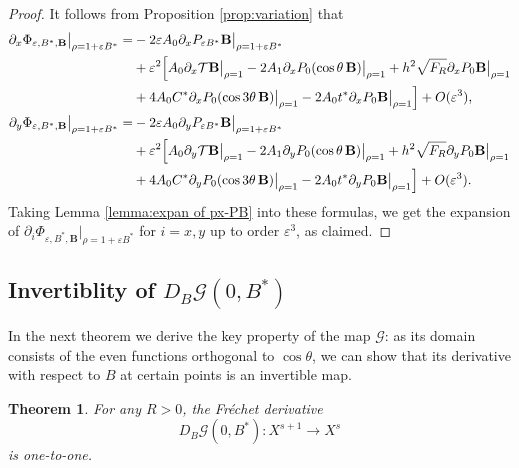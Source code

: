 \documentclass[12pt,reqno]{amsart}
\numberwithin{equation}{section}
\newtheorem{theorem}{Theorem}[section]
\theoremstyle{definition}
\theoremstyle{remark}
\begin{document}
\begin{proof}
It follows from Proposition \ref{prop:variation} that
\begin{align*}
\partial_x\Phi_{\varepsilon,B^*, \textbf{B}}\big|_{\rho=1+\varepsilon B^*}
=&-2\varepsilon A_0\partial_xP_{\varepsilon B^*}  \textbf{B}\big|_{\rho=1+\varepsilon B^*} \\
& +\varepsilon^2\Bigl[A_0\partial_x\mathcal{T} \textbf{B}\big|_{\rho=1}-2A_1\partial_xP_0(  \cos\theta\, \textbf{B})\big|_{\rho=1}
+h^2\sqrt{F_R}\partial_xP_0  \textbf{B}\big|_{\rho=1} \\
&  +4A_0C^*\partial_xP_0(\cos3\theta\,  \textbf{B} )\big|_{\rho=1}-2A_0t^*\partial_xP_0  \textbf{B}\big|_{\rho=1}\Bigr]+O(\varepsilon^3), \\
\partial_y\Phi_{\varepsilon,B^*,  \textbf{B}}\big|_{\rho=1+\varepsilon B^*}
=&-2\varepsilon A_0\partial_yP_{\varepsilon B^*}  \textbf{B}\big|_{\rho=1+\varepsilon B^*} \\
& +\varepsilon^2\Bigl[A_0\partial_y\mathcal{T}  \textbf{B}\big|_{\rho=1}-2A_1\partial_yP_0(  \cos\theta\, \textbf{B})\big|_{\rho=1}
+h^2\sqrt{F_R}\partial_yP_0  \textbf{B}\big|_{\rho=1} \\
&  +4A_0C^*\partial_yP_0(  \cos3\theta\, \textbf{B}  )\big|_{\rho=1}-2A_0t^*\partial_yP_0  \textbf{B}\big|_{\rho=1}\Bigr]+O(\varepsilon^3).
\end{align*}
Taking %
Lemma \ref{lemma:expan of px-PB} into these formulas, we get the expansion of $ \partial_i\Phi_{\varepsilon,B^*, \textbf{B}}\big|_{\rho=1+\varepsilon B^*} $ for $ i=x,y $ up to order $  \varepsilon^3  $, as claimed.
\end{proof}

\subsection{Invertiblity of $ D_B\mathcal{G}(0,B^*) $}
In the next theorem we derive the key property of the map $\mathcal{G}$: as its domain consists of the even functions orthogonal to $\cos\theta$, we can show that its derivative with respect to $B$ at certain points is an invertible map.

\begin{theorem}\label{thm:invert}
	For any $R>0$, the Fr\'echet derivative
	\[
	D_B\mathcal{G}(0,B^*) : X^{s+1} \to X^s
	\]
	is one-to-one.
\end{theorem} 
\end{document}
